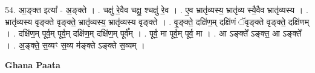 \documentclass[17pt]{extarticle}
\begin{document}
54. आ॒ङ्क्त इत्या᳚ - अ॒ङ्क्ते । . चक्षु॑ रे॒वैव चक्षु॒ श्चक्षु॑ रे॒व । . ए॒व भ्रातृ॑व्यस्य॒ भ्रातृ॑व्य स्यै॒वैव भ्रातृ॑व्यस्य । . भ्रातृ॑व्यस्य वृङ्क्ते वृङ्क्ते॒ भ्रातृ॑व्यस्य॒ भ्रातृ॑व्यस्य वृङ्क्ते । . वृ॒ङ्क्ते॒ दक्षि॑ण॒म् दक्षि॑णं ॅवृङ्क्ते वृङ्क्ते॒ दक्षि॑णम् । . दक्षि॑ण॒म् पूर्व॒म् पूर्व॒म् दक्षि॑ण॒म् दक्षि॑ण॒म् पूर्व᳚म् । . पूर्व॒ मा पूर्व॒म् पूर्व॒ मा । . आ ऽङ्क्ते᳚ ऽङ्क्त॒ आ ऽङ्क्ते᳚ । . अ॒ङ्क्ते॒ स॒व्यꣳ स॒व्य म॑ङ्क्ते ऽङ्क्ते स॒व्यम् । \newline

\textbf{Ghana Paata } \newline
\end{document}
